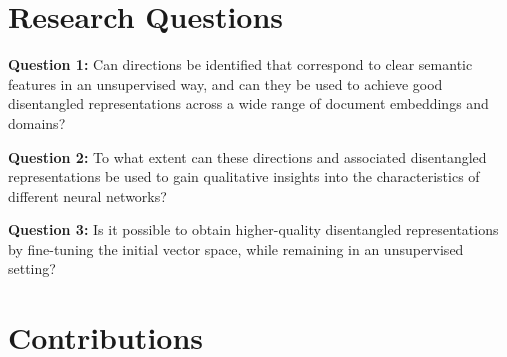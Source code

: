 
\section{Research Questions}

\textbf{Question 1:} Can directions be identified that correspond to clear semantic features in an unsupervised way, and  can they be used to achieve good disentangled representations  across a wide range of document embeddings  and domains?

\textbf{Question 2:} To what extent can these directions and associated disentangled representations be used to gain qualitative insights into the characteristics of different neural networks?

\textbf{Question 3:} Is it possible to obtain higher-quality disentangled representations by fine-tuning the initial vector space, while remaining in an unsupervised setting?

\section{Contributions}


